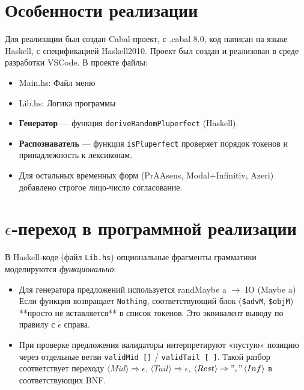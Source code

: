 \documentclass[areasetadvanced]{scrartcl}
\begin{document}
\section{Особенности реализации}
Для реализации был создан Cabal-проект, с .cabal 8.0, код написан на языке Haskell, с спецификацией Haskell2010. Проект был создан и реализован в среде разработки VSCode.
В проекте файлы:
\begin{itemize}
	\item Main.hs: Файл меню
	\item Lib.hs: Логика программы
\end{itemize}
\begin{itemize}
  \item \textbf{Генератор} — функция \verb|deriveRandomPluperfect| (Haskell).
  \item \textbf{Распознаватель} — функция \verb|isPluperfect| проверяет порядок токенов и принадлежность к лексиконам.
  \item Для остальных временных форм (PrAAsens, Modal+Infinitiv, Azeri) добавлено строгое лицо‑число согласование.
\end{itemize}

\newpage
\section{$\epsilon$-переход в программной реализации}

В Haskell-коде (файл \texttt{Lib.hs}) опциональные фрагменты грамматики
моделируются \emph{функционально}:\smallskip

\begin{itemize}
  \item Для генератора предложений используется
        randMaybe \:\: a $\rightarrow$ IO (Maybe a)
        Если функция возвращает \texttt{Nothing},
        соответствующий блок (\texttt{\$advM}, \texttt{\$objM}) **просто
        не вставляется** в список токенов.  
        Это эквивалент выводу по правилу с $\epsilon$ справа.
  \item При проверке предложения валидаторы интерпретируют «пустую»
        позицию через отдельные ветви \texttt{validMid []} / \texttt{validTail [\ ]}.
        Такой разбор соответствует переходу
        $\langle Mid\rangle\Rightarrow\epsilon$,
        $\langle Tail\rangle\Rightarrow\epsilon$,
        $\langle Rest\rangle\Rightarrow","\,\langle Inf\rangle$
        в соответствующих BNF.
\end{itemize}
\end{document}
